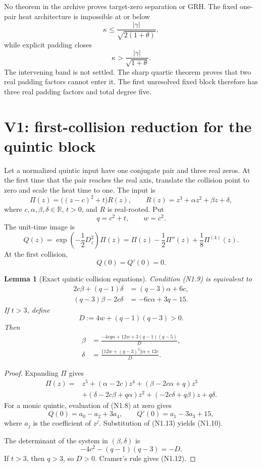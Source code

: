 \documentclass[11pt]{article}
\newtheorem{lemma}[theorem]{Lemma}
\theoremstyle{definition}
\theoremstyle{remark}
\newcommand{\R}{\mathbb R}
\begin{document}
No theorem in the archive proves target-zero separation or GRH.  The fixed
one-pair heat architecture is impossible at or below
\[
 \kappa\le\frac{|\gamma|}{\sqrt{2(1+\theta)}},
 \tag{N1.4}
\]
while explicit padding closes
\[
 \kappa>\frac{|\gamma|}{\sqrt{1+\theta}}.
 \tag{N1.5}
\]
The intervening band is not settled.  The sharp quartic theorem proves that
two real padding factors cannot enter it.  The first unresolved fixed block
therefore has three real padding factors and total degree five.

\section{V1: first-collision reduction for the quintic block}
\label{sec:f2v1-quintic}

Let a normalized quintic input have one conjugate pair and three real zeros.
At the first time that the pair reaches the real axis, translate the
collision point to zero and scale the heat time to one.  The input is
\[
 \Pi(z)=\bigl((z-c)^2+t\bigr)R(z),
 \qquad
 R(z)=z^3+\alpha z^2+\beta z+\delta,
 \tag{N1.6}
\]
where \(c,\alpha,\beta,\delta\in\R\), \(t>0\), and \(R\) is real-rooted.
Put
\[
 q=c^2+t,\qquad w=c^2.
 \tag{N1.7}
\]
The unit-time image is
\[
 Q(z)=\exp\!\left(-\frac12D_z^2\right)\Pi(z)
 =\Pi(z)-\frac12\Pi''(z)+\frac18\Pi^{(4)}(z).
 \tag{N1.8}
\]
At the first collision,
\[
 Q(0)=Q'(0)=0.
 \tag{N1.9}
\]

\begin{lemma}[Exact quintic collision equations]
\label{lem:f2v1-collision}
Condition \textup{(N1.9)} is equivalent to
\[
\begin{split}
 2c\beta+(q-1)\delta&=(q-3)\alpha+6c,\\
 (q-3)\beta-2c\delta&=-6c\alpha+3q-15.
\end{split}
\tag{N1.10}
\]
If \(t>3\), define
\[
 D:=4w+(q-1)(q-3)>0.
 \tag{N1.11}
\]
Then
\[
\boxed{
\begin{aligned}
 \beta&=
 \frac{-4cq\alpha+12w+3(q-1)(q-5)}{D},\\
 \delta&=
 \frac{\{12w+(q-3)^2\}\alpha+12c}{D}.
\end{aligned}}
\tag{N1.12}
\]
\end{lemma}

\begin{proof}
Expanding \(\Pi\) gives
\[
\begin{split}
\Pi(z)={}&z^5+(\alpha-2c)z^4
+(\beta-2c\alpha+q)z^3\\
&+(\delta-2c\beta+q\alpha)z^2
+(-2c\delta+q\beta)z+q\delta.
\end{split}
\tag{N1.13}
\]
For a monic quintic, evaluation of \textup{(N1.8)} at zero gives
\[
 Q(0)=a_0-a_2+3a_4,
 \qquad
 Q'(0)=a_1-3a_3+15,
\tag{N1.14}
\]
where \(a_j\) is the coefficient of \(z^j\).  Substitution of
\textup{(N1.13)} yields \textup{(N1.10)}.

The determinant of the system in \((\beta,\delta)\) is
\[
 -4c^2-(q-1)(q-3)=-D.
\]
If \(t>3\), then \(q>3\), so \(D>0\).  Cramer's rule gives
\textup{(N1.12)}.
\end{proof}
\end{document}
